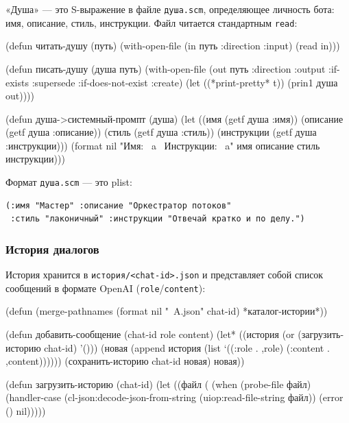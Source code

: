 \documentclass[11pt,a4paper]{article}
\begin{document}
«Душа» — это S-выражение в файле \texttt{душа.scm}, определяющее личность бота: имя, описание, стиль, инструкции. Файл читается стандартным \texttt{read}:

\begin{lispcode}[caption={мастер/cl/dusha.lisp}]
(defun читать-душу (путь)
  (with-open-file (in путь :direction :input)
    (read in)))

(defun писать-душу (душа путь)
  (with-open-file (out путь :direction :output
                   :if-exists :supersede
                   :if-does-not-exist :create)
    (let ((*print-pretty* t))
      (prin1 душа out))))

(defun душа->системный-промпт (душа)
  (let ((имя         (getf душа :имя))
        (описание    (getf душа :описание))
        (стиль       (getf душа :стиль))
        (инструкции  (getf душа :инструкции)))
    (format nil "Имя: ~a~%
                 Инструкции: ~a"
            имя описание стиль инструкции)))
\end{lispcode}

Формат \texttt{душа.scm} — это plist:
\begin{verbatim}
(:имя "Мастер" :описание "Оркестратор потоков"
 :стиль "лаконичный" :инструкции "Отвечай кратко и по делу.")
\end{verbatim}

\subsubsection{История диалогов}

История хранится в \texttt{история/<chat-id>.json} и представляет собой список сообщений в формате OpenAI (\texttt{role}/\texttt{content}):

\begin{lispcode}[caption={мастер/cl/история.lisp}]
(defun %
  (merge-pathnames (format nil "~A.json" chat-id)
                   *каталог-истории*))

(defun добавить-сообщение (chat-id role content)
  (let* ((история (or (загрузить-историю chat-id) '()))
         (новая (append история
                  (list `((:role . ,role)
                          (:content . ,content))))))
    (сохранить-историю chat-id новая)
    новая))

(defun загрузить-историю (chat-id)
  (let ((файл (%
    (when (probe-file файл)
      (handler-case
          (cl-json:decode-json-from-string
           (uiop:read-file-string файл))
        (error () nil)))))
\end{lispcode}
\end{document}
